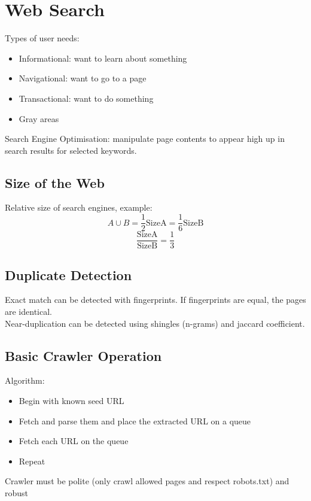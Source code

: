 \chapter{Web Search}
\begin{multicols*}{2}

\noindent Types of user needs:
\begin{itemize}
    \item Informational: want to learn about something
    \item Navigational: want to go to a page
    \item Transactional: want to do something
    \item Gray areas
\end{itemize}

\noindent Search Engine Optimisation: manipulate page contents to appear high up in search results for selected keywords.

\section{Size of the Web}
Relative size of search engines, example:
$$A\cup B = \frac{1}{2} \text{SizeA}  = \frac{1}{6}\text{SizeB}$$
$$\frac{\text{SizeA}}{\text{SizeB}} = \frac{1}{3}$$

\section{Duplicate Detection}
\noindent Exact match can be detected with fingerprints. If fingerprints are equal, the pages are identical. \\

\noindent Near-duplication can be detected using shingles (n-grams) and jaccard coefficient. 

\section{Basic Crawler Operation}
\noindent Algorithm:
\begin{itemize}
    \item Begin with known seed URL
    \item Fetch and parse them and place the extracted URL on a queue
    \item Fetch each URL on the queue
    \item Repeat
\end{itemize}

\noindent Crawler must be polite (only crawl allowed pages and respect robots.txt) and robust


\end{multicols*}
